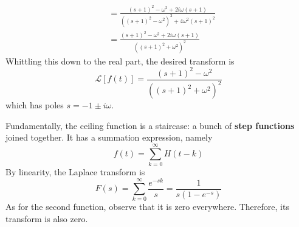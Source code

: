 \documentclass[a4paper]{article}
\begin{document}
\begin{enumerate}[label=(\alph*)]
\begin{align*}
								 & = \frac{\!\left( s + 1 \right)^{2} - \omega^{2} + 2i \omega \!\left( s + 1 \right)}{\!\left( \!\left( s + 1 \right)^{2} - \omega^{2} \right)^{2} + 4 \omega^{2}\!\left( s + 1 \right)^{2}} \\
								 & = \frac{\!\left( s + 1 \right)^{2} - \omega^{2} + 2i \omega \!\left( s + 1 \right)}{\!\left( \!\left( s + 1 \right)^{2} + \omega^{2} \right)^{2}}
	\end{align*}
	Whittling this down to the real part, the desired transform is
	\[
		\mathcal{L}\!\left[ f \!\left( t \right) \right] = \frac{\!\left( s + 1 \right)^{2} - \omega^{2}}{\!\left( \!\left( s + 1 \right)^{2} + \omega^{2} \right)^{2}} 
	\]
	which has poles \( s = -1 \pm i \omega \).
\end{enumerate}


Fundamentally, the ceiling function is a staircase: a bunch of \textbf{step functions} joined together. It has a summation expression, namely
\[
	f \!\left( t \right) = \sum^{\infty}_{k = 0} H \!\left( t - k \right) 
\]
By linearity, the Laplace transform is
\[
	F \!\left( s \right) = \sum^{\infty}_{k = 0} \frac{e^{-sk}}{s} = \frac{1}{s \!\left( 1 - e^{-s} \right)}
\]
As for the second function, observe that it is zero everywhere. Therefore, its transform is also zero.

\vspace{12pt}

\end{document}
